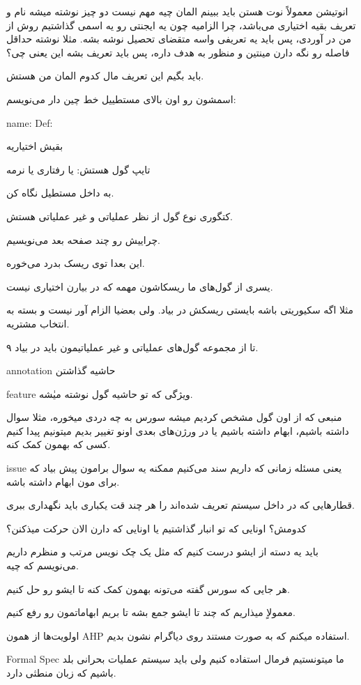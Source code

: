 انوتیشن معمولاً نوت هستن باید ببینم المان چیه مهم نیست دو چیز نوشته میشه نام و
تعریف بقیه اختیاری می‌باشد، چرا الزامیه چون یه ایجنتی رو یه اسمی گذاشتیم روش از
من در آوردی، پس باید یه تعریفی واسه متقضای تحصیل نوشه بشه. مثلا نوشته حداقل
فاصله رو نگه دارن مینتین و منظور به هدف داره، پس باید تعریف بشه این یعنی چی؟

باید بگیم این تعریف مال کدوم المان من هستش.

اسمشون رو اون بالای مستطییل خط چین دار می‌نویسم:

name:
Def:

بقیش اختیاریه

تایپ گول هستش: یا رفتاری یا نرمه

به داخل مستطیل نگاه کن.

کتگوری نوع گول از نظر عملیاتی و غیر عملیاتی هستش.

چراییش رو چند صفحه بعد می‌نویسیم.

این بعدا توی ریسک بدرد می‌خوره.

یسری از گول‌های ما ریسکاشون مهمه که در بیارن اختیاری نیست.

مثلا اگه سکیوریتی باشه بایستی ریسکش در بیاد. ولی بعضیا الزام آور نیست و بسته به
انتخاب مشتریه.

۹ تا از مجموعه گول‌های عملیاتی و غیر عملیاتیمون باید در بیاد.

annotation حاشیه گذاشتن

feature ويژگی که تو حاشیه گول نوشته میٰشه.

منبعی که از اون گول مشخص کردیم میشه سورس
به چه دردی میخوره، مثلا سوال داشته باشیم، ابهام داشته باشیم یا در ورژن‌های بعدی
اونو تغییر بدیم میتونیم پیدا کنیم کسی که بهمون کمک کنه.

issue یعنی مسئله زمانی که داریم سند می‌کنیم ممکنه یه سوال برامون پیش بیاد که
برای مون ابهام داشته باشه.

قطار‌هایی که در داخل سیستم تعریف شده‌اند را هر چند قت یکباری باید نگهداری ببری.

کدومش؟ اونایی که تو انبار گذاشتیم یا اونایی که دارن الان حرکت میذکنن؟

باید یه دسته از ایشو درست کنیم که مثل یک چک نویس مرتب و منظرم داریم می‌نویسم که
چیه.

هر جایی که سورس گفته می‌تونه بهمون کمک کنه تا ایشو رو حل کنیم.

معمولاٍ میذاریم که چند تا ایشو جمع بشه تا بریم ابهاماتمون رو رفع کنیم.

اولویت‌ها از همون AHP استفاده میکنم که به صورت مستند روی دیاگرام نشون بدیم.

Formal Spec ما میتونستیم فرمال استفاده کنیم ولی باید سیستم عملیات بحرانی بلد
باشیم که زبان منطثی دارد.

